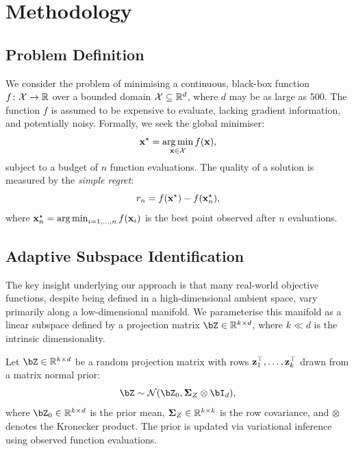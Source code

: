 \chapter{Methodology}
\label{ch:methodology}

\section{Problem Definition}
\label{sec:problem-definition}

We consider the problem of minimising a continuous, black-box function
$f \colon \mathcal{X} \to \mathbb{R}$ over a bounded domain $\mathcal{X} \subseteq \mathbb{R}^d$, where $d$
may be as large as 500.  The function $f$ is assumed to be expensive to
evaluate, lacking gradient information, and potentially noisy.  Formally, we
seek the global minimiser:
\begin{equation}
    \mathbf{x}^\star = \operatorname*{arg\,min}_{\mathbf{x} \in \mathcal{X}} f(\mathbf{x}),
    \label{eq:objective}
\end{equation}
subject to a budget of $n$ function evaluations.  The quality of a solution is
measured by the \emph{simple regret}:
\begin{equation}
    r_n = f(\mathbf{x}^\star) - f(\mathbf{x}_n^\star),
    \label{eq:regret}
\end{equation}
where $\mathbf{x}_n^\star = \operatorname*{arg\,min}_{i=1,\ldots,n} f(\mathbf{x}_i)$ is the best point
observed after $n$ evaluations.

\section{Adaptive Subspace Identification}
\label{sec:adaptive-subspace}

The key insight underlying our approach is that many real-world objective
functions, despite being defined in a high-dimensional ambient space, vary
primarily along a low-dimensional manifold.  We parameterise this manifold as a
linear subspace defined by a projection matrix
$\bZ \in \R^{k \times d}$, where $k \ll d$ is the intrinsic dimensionality.

\begin{definitionbox}[title=Adaptive Subspace Prior]
\label{def:subspace-prior}
Let $\bZ \in \R^{k \times d}$ be a random projection matrix with rows
$\mathbf{z}_1^\top, \ldots, \mathbf{z}_k^\top$ drawn from a matrix normal prior:
\begin{equation}
    \bZ \sim \cN(\bZ_0, \bSigma_Z \otimes \bI_d),
    \label{eq:subspace-prior}
\end{equation}
where $\bZ_0 \in \R^{k \times d}$ is the prior mean, $\boldsymbol{\Sigma}_Z \in \mathbb{R}^{k \times k}$
is the row covariance, and $\otimes$ denotes the Kronecker product.  The prior is
updated via variational inference using observed function evaluations.
\end{definitionbox}


